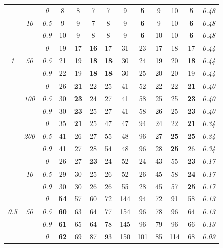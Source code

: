 \documentclass[12pt]{article}
\begin{document}
\begin{table}
\begin{center}
\begin{tabular}{ccc|cc|cc|cc|cc|c|c}
\cline{2-3}\hline\rule{0pt}{3ex}
& & \it  0  & 8 & 8 & 7 & 7 & 9 & {\bf 5} & 9 & 10 & {\bf 5} & \it  0.48 \\
 & \it  10  & \it  0.5  & 9 & 9 & 7 & 8 & 9 & {\bf 6} & 9 & 10 & {\bf 6} & \it  0.48 \\
& & \it  0.9  & 10 & 9 & 8 & 8 & 9 & {\bf 6} & 10 & 10 & {\bf 6} & \it  0.48 \\[1ex]
\cline{2-3}\rule{0pt}{3ex}
& & \it  0  & 19 & 17 & {\bf 16} & 17 & 31 & 23 & 17 & 18 & 17 & \it  0.44 \\
\it  1  & \it  50  & \it  0.5  & 21 & 19 & {\bf 18} & {\bf 18} & 30 & 24 & 19 & 20 & {\bf 18} & \it  0.44 \\
& & \it  0.9  & 22 & 19 & {\bf 18} & {\bf 18} & 30 & 25 & 20 & 20 & 19 & \it  0.44 \\[1ex]
\cline{2-3}\rule{0pt}{3ex}
& & \it  0  & 26 & {\bf 21} & 22 & 25 & 41 & 52 & 22 & 22 & {\bf 21} & \it  0.40 \\
 & \it  100  & \it  0.5  & 30 & {\bf 23} & 24 & 27 & 41 & 58 & 25 & 25 & {\bf 23} & \it  0.40 \\
& & \it  0.9  & 30 & {\bf 23} & 25 & 27 & 41 & 58 & 26 & 25 & {\bf 23} & \it  0.40 \\[1ex]
\cline{2-3}\rule{0pt}{3ex}
& & \it  0  & 35 & {\bf 21} & 25 & 47 & 47 & 94 & 24 & 22 & {\bf 21} & \it  0.34 \\
 & \it  200  & \it  0.5  & 41 & 26 & 27 & 55 & 48 & 96 & 27 & {\bf 25} & {\bf 25} & \it  0.34 \\
& & \it  0.9  & 41 & 27 & 28 & 54 & 48 & 96 & 28 & {\bf 25} & 26 & \it  0.34 \\[1ex]
\cline{2-3}\hline\rule{0pt}{3ex}
& & \it  0  & 26 & 27 & {\bf 23} & 24 & 52 & 24 & 43 & 55 & {\bf 23} & \it  0.17 \\
 & \it  10  & \it  0.5  & 29 & 30 & 25 & 26 & 52 & 26 & 45 & 58 & {\bf 24} & \it  0.17 \\
& & \it  0.9  & 30 & 30 & 26 & 26 & 55 & 28 & 45 & 57 & {\bf 25} & \it  0.17 \\[1ex]
\cline{2-3}\rule{0pt}{3ex}
& & \it  0  & {\bf 54} & 57 & 60 & 72 & 144 & 94 & 72 & 91 & 58 & \it  0.13 \\
\it  0.5  & \it  50  & \it  0.5  & {\bf 60} & 63 & 64 & 77 & 154 & 96 & 78 & 96 & 64 & \it  0.13 \\
& & \it  0.9  & {\bf 61} & 65 & 64 & 78 & 145 & 96 & 79 & 96 & 66 & \it  0.13 \\[1ex]
\cline{2-3}\rule{0pt}{3ex}
& & \it  0  & {\bf 62} & 69 & 87 & 93 & 150 & 101 & 85 & 114 & 68 & \it  0.09 \\

\end{tabular}
\end{center}
\end{table}
\end{document}
